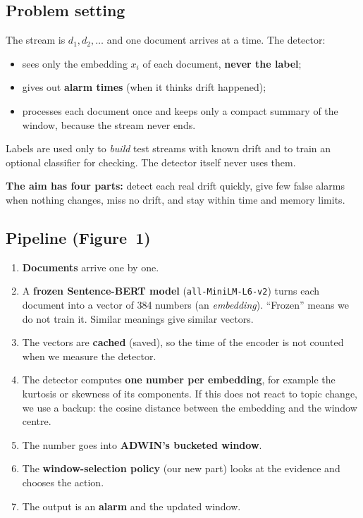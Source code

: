 \documentclass[11pt,a4paper]{article}
\begin{document}
\subsection{Problem setting}
The stream is $d_1,d_2,\dots$ and one document arrives at a time. The detector:
\begin{itemize}
  \item sees only the embedding $x_i$ of each document, \textbf{never the label};
  \item gives out \textbf{alarm times} (when it thinks drift happened);
  \item processes each document once and keeps only a compact summary of the window, because the stream never ends.
\end{itemize}
Labels are used only to \emph{build} test streams with known drift and to train an optional classifier for checking. The detector itself never uses them.

\textbf{The aim has four parts:} detect each real drift quickly, give few false alarms when nothing changes, miss no drift, and stay within time and memory limits.

\subsection{Pipeline (Figure~1)}
\begin{enumerate}
  \item \textbf{Documents} arrive one by one.
  \item A \textbf{frozen Sentence-BERT model} (\texttt{all-MiniLM-L6-v2}) turns each document into a vector of 384 numbers (an \emph{embedding}). ``Frozen'' means we do not train it. Similar meanings give similar vectors.
  \item The vectors are \textbf{cached} (saved), so the time of the encoder is not counted when we measure the detector.
  \item The detector computes \textbf{one number per embedding}, for example the kurtosis or skewness of its components. If this does not react to topic change, we use a backup: the cosine distance between the embedding and the window centre.
  \item The number goes into \textbf{ADWIN's bucketed window}.
  \item The \textbf{window-selection policy} (our new part) looks at the evidence and chooses the action.
  \item The output is an \textbf{alarm} and the updated window.
\end{enumerate}
\end{document}
